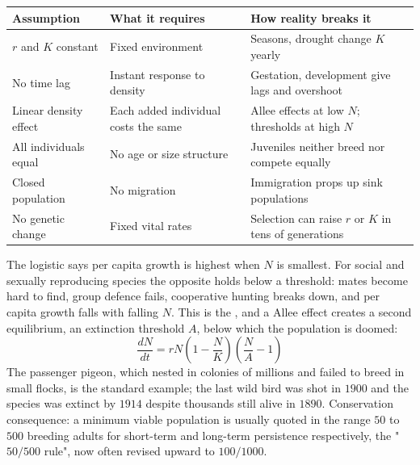 \begin{tabular}{@{}p{3.4cm}p{3.2cm}p{4.0cm}@{}}
\toprule
\textbf{Assumption} & \textbf{What it requires} & \textbf{How reality breaks it}\\
\midrule
$r$ and $K$ constant & Fixed environment & Seasons, drought change $K$ yearly\\
No time lag & Instant response to density & Gestation, development give lags and overshoot\\
Linear density effect & Each added individual costs the same & Allee effects at low $N$; thresholds at high $N$\\
All individuals equal & No age or size structure & Juveniles neither breed nor compete equally\\
Closed population & No migration & Immigration props up sink populations\\
No genetic change & Fixed vital rates & Selection can raise $r$ or $K$ in tens of generations\\
\bottomrule
\end{tabular}

\begin{obsbox}[title={WORTH NOTICING: the Allee effect inverts the logistic at low $N$}]
The logistic says per capita growth is highest when $N$ is smallest. For social
and sexually reproducing species the opposite holds below a threshold: mates
become hard to find, group defence fails, cooperative hunting breaks down, and
per capita growth falls with falling $N$. This is the , and a
 Allee effect creates a second equilibrium, an extinction threshold
$A$, below which the population is doomed:
\[
\frac{dN}{dt}=rN\left(1-\frac{N}{K}\right)\left(\frac{N}{A}-1\right)
\]
The passenger pigeon, which nested in colonies of millions and failed to breed in
small flocks, is the standard example; the last wild bird was shot in $1900$ and
the species was extinct by $1914$ despite thousands still alive in $1890$.
Conservation consequence: a minimum viable population is usually quoted in the
range $50$ to $500$ breeding adults for short-term and long-term persistence
respectively, the "$50/500$ rule", now often revised upward to $100/1000$.
\end{obsbox}
